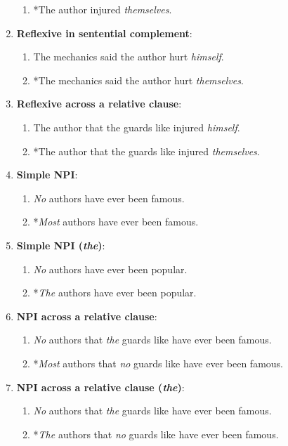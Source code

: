 \begin{enumerate}[noitemsep]
\begin{enumerate}
      \item *The author injured \textit{themselves}.
    \end{enumerate}
  \item \textbf{Reflexive in sentential complement}:
    \begin{enumerate}
      \item The mechanics said the author hurt \textit{himself}.
      \item *The mechanics said the author hurt \textit{themselves}.
    \end{enumerate}
  \item \textbf{Reflexive across a relative clause}:
    \begin{enumerate}
      \item The author that the guards like injured \textit{himself}.
      \item *The author that the guards like injured \textit{themselves}.
    \end{enumerate}
  \item \textbf{Simple NPI}:
    \begin{enumerate}
      \item \textit{No} authors have ever been famous.
      \item *\textit{Most} authors have ever been famous.
    \end{enumerate}
  \item \textbf{Simple NPI (\textit{the})}:
    \begin{enumerate}
      \item \textit{No} authors have ever been popular.
      \item *\textit{The} authors have ever been popular.
    \end{enumerate}
  \item \textbf{NPI across a relative clause}:
    \begin{enumerate}
      \item \textit{No} authors that \textit{the} guards like have ever been famous.
      \item *\textit{Most} authors that \textit{no} guards like have ever been famous.
    \end{enumerate}
  \item \textbf{NPI across a relative clause (\textit{the})}:
    \begin{enumerate}
      \item \textit{No} authors that \textit{the} guards like have ever been famous.
      \item *\textit{The} authors that \textit{no} guards like have ever been famous.
    \end{enumerate}
\end{enumerate}



